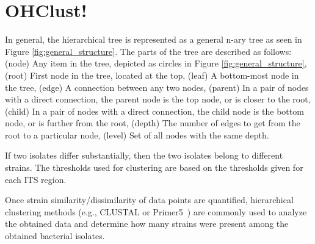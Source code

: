 \documentclass[12pt]{ucthesis}
\begin{document}
\chapter{OHClust!}\label{chap:algorithm}
      In general, the hierarchical tree is represented as a general n-ary tree as seen in Figure
      \ref{fig:general_structure}. The parts of the tree are described as follows:
      (node) Any item in the tree, depicted as circles in Figure
      \ref{fig:general_structure}, (root) First node in the tree, located at the top,
      (leaf) A bottom-most node in the tree, (edge) A connection between any two
      nodes, (parent) In a pair of nodes with a direct connection, the parent node is
      the top node, or is closer to the root, (child) In a pair of nodes with a
      direct connection, the child node is the bottom node, or is further from the
      root, (depth) The number of edges to get from the root to a particular node,
      (level) Set of all nodes with the same depth.

      If two isolates differ substantially, then the two isolates
      belong to different strains. The thresholds used for clustering are based
      on the thresholds given for each ITS region.

      Once strain similarity/dissimilarity of data points are quantified,
      hierarchical clustering methods (e.g., CLUSTAL or Primer5~\cite{Primer5:methods})
      are commonly used to analyze the obtained data and determine
      how many strains were present among the obtained bacterial isolates.
      
\end{document}
